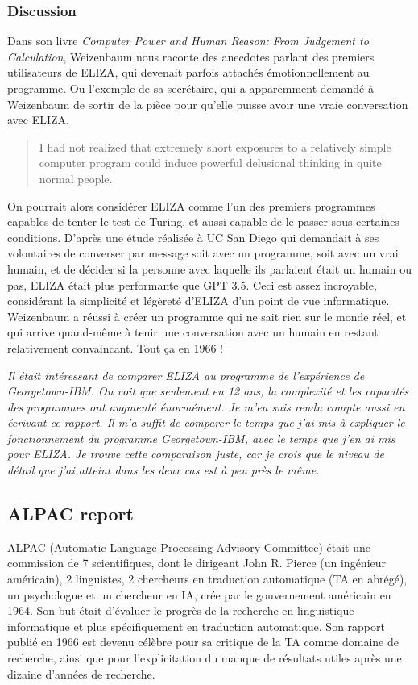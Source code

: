 \documentclass[11pt, a4paper]{report}
\begin{document}
      \subsubsection{Discussion}
Dans son livre \textit{Computer Power and Human Reason: From Judgement to Calculation}, 
Weizenbaum nous raconte des anecdotes parlant des premiers utilisateurs de ELIZA, 
qui devenait parfois attachés émotionnellement au programme. Ou l'exemple de sa 
secrétaire, qui a apparemment demandé à Weizenbaum de sortir de la pièce pour qu'elle 
puisse avoir une vraie conversation avec ELIZA.  

\begin{quote}
  I had not realized that extremely short exposures to a relatively simple computer program could 
  induce powerful delusional thinking in quite normal people.
  \cite{weizenbaum-book}
\end{quote}

On pourrait alors considérer ELIZA comme l'un des premiers programmes capables de tenter 
le test de Turing, et aussi capable de le passer sous certaines conditions. 
D'après une étude réalisée à UC San Diego \cite{eliza-gpt} qui demandait à ses volontaires de converser 
par message soit avec un programme, soit avec un vrai humain, et de décider si la personne 
avec laquelle ils parlaient était un humain ou pas, ELIZA était plus performante que GPT 3.5. 
Ceci est assez incroyable, considérant la simplicité et légèreté d'ELIZA d'un point de vue 
informatique. Weizenbaum a réussi à créer un programme qui ne sait rien sur le monde réel, 
et qui arrive quand-même à tenir une conversation avec un humain en restant relativement 
convaincant. Tout ça en 1966 ! 

\textit{Il était intéressant de comparer ELIZA au programme de l'expérience de Georgetown-IBM. 
On voit que seulement en 12 ans, la complexité et les capacités des programmes ont augmenté 
énormément. Je m'en suis rendu compte aussi en écrivant ce rapport. Il m'a suffit de comparer 
le temps que j'ai mis à expliquer le fonctionnement du programme Georgetown-IBM, avec le temps 
que j'en ai mis pour ELIZA. Je trouve cette comparaison juste, car je crois que le niveau de 
détail que j'ai atteint dans les deux cas est à peu près le même. }


  \subsection{ALPAC report} 
  ALPAC (Automatic Language Processing Advisory Committee) était une commission de 7 scientifiques, 
  dont le dirigeant John R. Pierce (un ingénieur américain), 2 linguistes, 2 chercheurs en traduction 
  automatique (TA en abrégé), un psychologue et un chercheur en IA, 
  crée par le gouvernement américain en 1964. Son but était d'évaluer le progrès de la 
  recherche en linguistique informatique et plus spécifiquement en traduction automatique. Son rapport 
  publié en 1966 est devenu célèbre pour sa critique de la TA comme domaine de recherche, 
  ainsi que pour l'explicitation du manque de résultats utiles après une dizaine d'années de recherche. 
\end{document}
